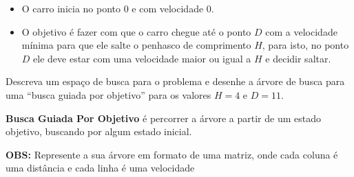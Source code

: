 \documentclass[12pt]{article}
\begin{document}
\begin{enumerate}
\begin{itemize}
\begin{itemize}
\end{itemize}

\item O carro inicia no ponto $0$ e com velocidade $0$. 

\item O objetivo é fazer com que o carro chegue até o ponto $D$ com a velocidade mínima para que ele salte o penhasco de comprimento $H$, para isto, no ponto $D$ ele deve estar com uma velocidade maior ou igual a $H$ e decidir saltar.

\end{itemize}

Descreva um espaço de busca para o problema e desenhe a árvore de  busca para uma ``busca guiada por objetivo'' para os valores $H = 4$ e $D = 11$. 

\textbf{Busca Guiada Por Objetivo} é percorrer a árvore a partir de um estado objetivo, buscando por algum estado inicial.

\textbf{OBS:} Represente a sua árvore em formato de uma matriz, onde cada coluna é uma distância e cada linha é uma velocidade

\break















\end{enumerate}
\end{document}
